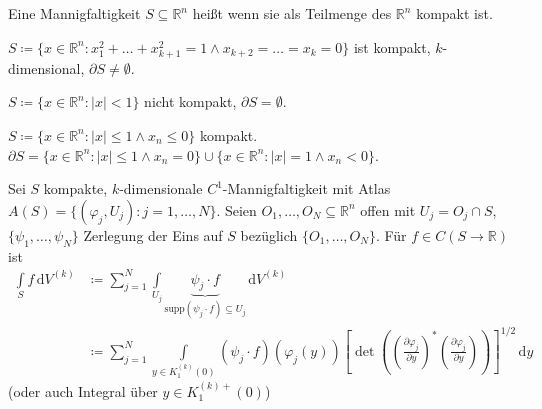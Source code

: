 \begin{theorem}[Definition] \label{thm:11.3}
  Eine Mannigfaltigkeit $S \subseteq \mathbb{R}^n$ heißt  wenn sie als Teilmenge des $\mathbb{R}^n$ kompakt ist.
\end{theorem}

\begin{example} \label{thm:11.4}
  \begin{enum-arab}
    \item $S \coloneq \{ x \in \mathbb{R}^n : x_1^2 + \ldots + x_{k+1}^2 = 1 \land x_{k+2} = \ldots = x_k = 0 \}$ ist kompakt, $k$-dimensional, $\partial S \neq \emptyset$.
    
    \item $S \coloneq \{ x \in \mathbb{R}^n : |x| < 1 \}$ nicht kompakt, $\partial S = \emptyset$.
    
    \item $S \coloneq \{ x \in \mathbb{R}^n : |x| \leq 1 \land x_n \leq 0 \}$ kompakt. $\partial S = \{ x \in \mathbb{R}^n : |x| \leq 1 \land x_n = 0 \} \cup \{ x \in \mathbb{R}^n : |x| = 1 \land x_n < 0 \}$.
  \end{enum-arab}
\end{example}

\begin{theorem}[Definition] \label{thm:11.5}
  Sei $S$ kompakte, $k$-dimensionale $C^1$-Mannigfaltigkeit mit Atlas $A(S) = \{ (\varphi_j,U_j) : j = 1,\ldots,N \}$. Seien $O_1,\ldots,O_N \subseteq \mathbb{R}^n$ offen mit $U_j = O_j \cap S$, $\{ \psi_1,\ldots,\psi_N \}$ Zerlegung der Eins auf $S$ bezüglich $\{ O_1,\ldots,O_N \}$. Für $f \in C(S \to \mathbb{R})$ ist
  \begin{align*}
    \int\limits_{S} f \, \mathrm{d}V^{(k)}
    &\coloneq \sum\limits_{j=1}^{N} \int\limits_{U_j} \underbrace{\psi_j \cdot f}_{\mathrm{supp}(\psi_j \cdot f) \subseteq U_j} \, \mathrm{d}V^{(k)} \\
    &\coloneq \sum\limits_{j=1}^{N} \int\limits_{y \in K_1^{(k)}(0)} (\psi_j \cdot f) (\varphi_j(y)) \left[ \det \left( \left( \frac{\partial \varphi_j}{\partial y} \right)^* \left( \frac{\partial \varphi_j}{\partial y} \right) \right) \right]^{1/2} \, \mathrm{d}y
  \end{align*}
  (oder auch Integral über $y \in K_1^{(k)+}(0)$)
\end{theorem}

